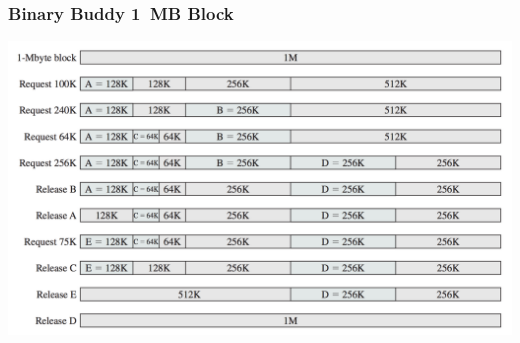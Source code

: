 \begin{frame}
\frametitle{Binary Buddy 1~MB Block}

\begin{center}
\includegraphics[width=\textwidth]{images/binary-buddy.png}
\end{center}


\end{frame}




